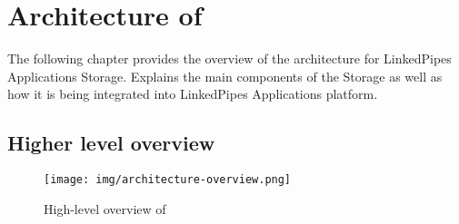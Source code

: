\chapter{Architecture of \lpa{}}
\label{chap:num_4}

The following chapter provides the overview of the architecture for LinkedPipes Applications Storage. Explains the main components of the Storage as well as how it is being integrated into LinkedPipes Applications platform.

\section{Higher level overview}


\begin{figure}[h]
\centering
\texttt{[image: img/architecture-overview.png]}
\caption{High-level overview of \lpas}
\label{fig:lpas-high-level-arch}
\end{figure}